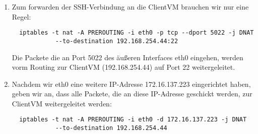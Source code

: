 \documentclass{scrartcl}
\begin{document}
\begin{enumerate}[\bfseries 1.]
		\item
		      Zum forwarden der SSH-Verbindung an die ClientVM brauchen wir nur eine Regel:
		      \begin{lstlisting}
  iptables -t nat -A PREROUTING -i eth0 -p tcp --dport 5022 -j DNAT
            --to-destination 192.168.254.44:22
		\end{lstlisting}
		Die Packete die an Port 5022 des äußeren Interfaces eth0 eingehen, werden vorm
		Routing zur ClientVM (192.168.254.44) auf Port 22 weitergeleitet.

		\item
		      Nachdem wir eth0 eine weitere IP-Adresse 172.16.137.223 eingerichtet haben,
		      geben wir an, dass alle Packete, die an diese IP-Adresse geschickt werden,
		      zur ClientVM weitergeleitet werden:
		      \begin{lstlisting}
  iptables -t nat -A PREROUTING -i eth0 -d 172.16.137.223 -j DNAT
            --to-destination 192.168.254.44
		\end{lstlisting}
	\end{enumerate}
\end{document}
